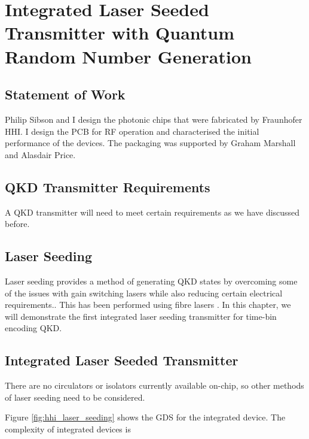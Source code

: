 %
%
\graphicspath{{./chapters/chapter06/fig06/}}

\let\textcircled=\pgftextcircled
\chapter{Integrated Laser Seeded Transmitter with Quantum Random Number Generation}
\label{chap:laser-seeding}

\section*{Statement of Work}

Philip Sibson and I design the photonic chips that were fabricated by Fraunhofer HHI. I design the PCB for RF operation and characterised the initial performance of the devices. The packaging was supported by Graham Marshall and Alasdair Price.

\section{QKD Transmitter Requirements}
\label{sec:sec06}

A \ac{QKD} transmitter will need to meet certain requirements as we have discussed before.

\section{Laser Seeding}

Laser seeding provides a method of generating \ac{QKD} states by overcoming some of the issues with gain switching lasers while also reducing certain electrical requirements.. This has been performed using fibre lasers \cite{}. In this chapter, we will demonstrate the first integrated laser seeding transmitter for time-bin encoding \ac{QKD}. 

\section{Integrated Laser Seeded Transmitter}

There are no circulators or isolators currently available on-chip, so other methods of laser seeding need to be considered.

Figure \ref{fig:hhi_laser_seeding} shows the GDS for the integrated device. The complexity of integrated devices is 

